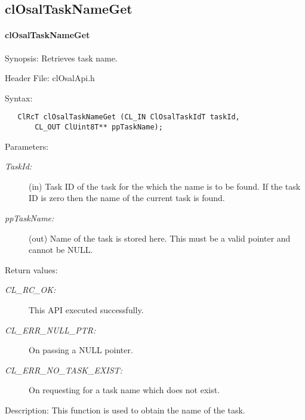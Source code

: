 \subsection{clOsalTaskNameGet} 
\hypertarget{pageosal106}{}\paragraph{cl\-Osal\-Task\-Name\-Get}\label{pageosal106}
\begin{Desc}
\item[Synopsis:]Retrieves task name.\end{Desc}
\begin{Desc}
\item[Header File:]clOsalApi.h\end{Desc}
\begin{Desc}
\item[Syntax:]

\footnotesize\begin{verbatim}   ClRcT clOsalTaskNameGet (CL_IN ClOsalTaskIdT taskId,
       CL_OUT ClUint8T** ppTaskName);
\end{verbatim}
\normalsize
\end{Desc}
\begin{Desc}
\item[Parameters:]
\begin{description}
\item[{\em Task\-Id:}](in) Task ID of the task for the which the name is to be found. If the task ID is zero then the name of the current task is found.
\item[{\em pp\-Task\-Name:}](out) Name of the task is stored here. This must be a valid pointer and cannot be NULL.\end{description}
\end{Desc}
\begin{Desc}
\item[Return values:]
\begin{description}
\item[{\em CL\_\-RC\_\-OK:}]This API executed successfully. \item[{\em CL\_\-ERR\_\-NULL\_\-PTR:}]On passing a NULL pointer. \item[{\em CL\_\-ERR\_\-NO\_\-TASK\_\-EXIST:}]On requesting for a task name which does not exist.\end{description}
\end{Desc}
\begin{Desc}
\item[Description:]This function is used to obtain the name of the task.\end{Desc}
